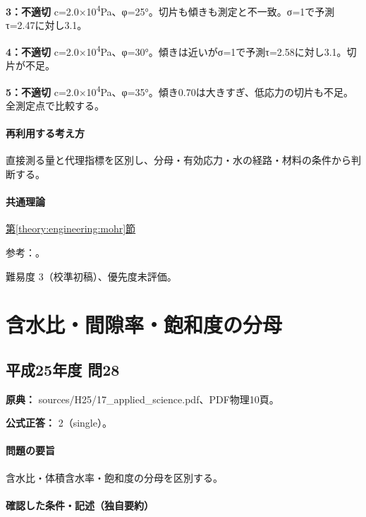\noindent\textbf{3：不適切} c=\allowbreak{}2.0×10\textsuperscript{4}Pa、φ=25°。切片も傾きも測定と不一致。σ=1で予測τ=2.47に対し3.1。\par

\noindent\textbf{4：不適切} c=\allowbreak{}2.0×10\textsuperscript{4}Pa、φ=30°。傾きは近いがσ=1で予測τ=2.58に対し3.1。切片が不足。\par

\noindent\textbf{5：不適切} c=\allowbreak{}2.0×10\textsuperscript{4}Pa、φ=35°。傾き0.70は大きすぎ、低応力の切片も不足。全測定点で比較する。\par

\paragraph{再利用する考え方} 直接測る量と代理指標を区別し、分母・有効応力・水の経路・材料の条件から判断する。

\paragraph{共通理論} \hyperref[theory:engineering:mohr]{第\ref*{theory:engineering:mohr}節}

\par 参考：\cite{eng52_mohr_ref}。

\par 難易度 3（校準初稿）、優先度未評価。

\section{含水比・間隙率・飽和度の分母}

\subsection{平成25年度 問28}
\label{q:h25-reg-applied-28}

\noindent\textbf{原典：} sources/H25/17\_applied\_science.pdf、PDF物理10頁。

\textbf{公式正答：} 2（single）。

\paragraph{問題の要旨} 含水比・体積含水率・飽和度の分母を区別する。

\paragraph{確認した条件・記述（独自要約）}\mbox{}\par

